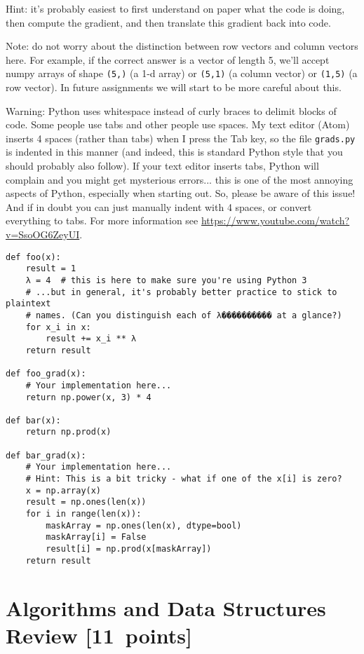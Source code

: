 \documentclass{article}
\newcommand\pts[1]{\textcolor{pointscolour}{[#1~points]}}
\begin{document}
  Hint: it's probably easiest to first understand on paper what the code is doing, then compute
  the gradient, and then translate this gradient back into code.

  Note: do not worry about the distinction between row vectors and column vectors here.
  For example, if the correct answer is a vector of length 5, we'll accept numpy arrays
  of shape \texttt{(5,)} (a 1-d array) or \texttt{(5,1)} (a column vector) or
  \texttt{(1,5)} (a row vector). In future assignments we will start to be more careful
  about this.

  Warning: Python uses whitespace instead of curly braces to delimit blocks of code.
  Some people use tabs and other people use spaces. My text editor (Atom) inserts 4 spaces (rather than tabs) when
  I press the Tab key, so the file \texttt{grads.py} is indented in this manner (and indeed, this is standard Python style that you should probably also follow). If your text editor inserts tabs,
  Python will complain and you might get mysterious errors... this is one of the most annoying aspects
  of Python, especially when starting out. So, please be aware of this issue! And if in doubt you can just manually
  indent with 4 spaces, or convert everything to tabs. For more information
  see \url{https://www.youtube.com/watch?v=SsoOG6ZeyUI}.
\begin{verbatim}
def foo(x):
    result = 1
    λ = 4  # this is here to make sure you're using Python 3
    # ...but in general, it's probably better practice to stick to plaintext
    # names. (Can you distinguish each of λ���������� at a glance?)
    for x_i in x:
        result += x_i ** λ
    return result

def foo_grad(x):
    # Your implementation here...
    return np.power(x, 3) * 4

def bar(x):
    return np.prod(x)

def bar_grad(x):
    # Your implementation here...
    # Hint: This is a bit tricky - what if one of the x[i] is zero?
    x = np.array(x)
    result = np.ones(len(x))
    for i in range(len(x)):
        maskArray = np.ones(len(x), dtype=bool)
        maskArray[i] = False
        result[i] = np.prod(x[maskArray])
    return result
\end{verbatim}


  \clearpage\section{Algorithms and Data Structures Review \pts{11}}
\end{document}
